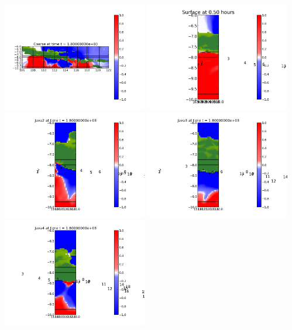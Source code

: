 \documentclass[11pt]{article}
\begin{document}
\vskip 10pt 
\includegraphics[width=0.475\textwidth]{frame0002fig0.png}
\includegraphics[width=0.475\textwidth]{frame0002fig15.png}
\vskip 10pt 
\includegraphics[width=0.475\textwidth]{frame0002fig25.png}
\includegraphics[width=0.475\textwidth]{frame0002fig20.png}
\vskip 10pt 
\includegraphics[width=0.475\textwidth]{frame0002fig30.png}
\end{document}
